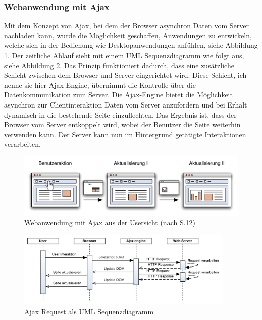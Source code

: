   \subsubsection{Webanwendung mit Ajax}
  
  Mit dem Konzept von \ac{Ajax}, bei dem der Browser asynchron Daten vom Server
  nachladen kann, wurde die Möglichkeit geschaffen, Anwendungen zu entwickeln,
  welche sich in der Bedienung wie Desktopanwendungen anfühlen, siehe Abbildung
  \ref{img:ajaxPageReload}. Der zeitliche Ablauf sieht mit einem \ac{UML}
  Sequenzdiagramm wie folgt aus, siehe Abbildung
  \ref{img:sequenzdiagrammAjaxPageReload}. Das Prinzip funktioniert dadurch,
  dass eine zusätzliche Schicht zwischen dem Browser und Server eingerichtet
  wird. Diese Schicht, ich nenne sie hier Ajax-Engine, übernimmt die Kontrolle
  über die Datenkommunikation zum Server. Die Ajax-Engine bietet die
  Möglichkeit asynchron zur Clientinteraktion Daten vom Server anzufordern und
  bei Erhalt dynamisch in die bestehende Seite einzuflechten. Das Ergebnis ist,
  dass der Browser vom Server entkoppelt wird, wobei der Benutzer die Seite
  weiterhin verwenden kann. Der Server kann nun im Hintergrund getätigte
  Interaktionen verarbeiten.
  
  \begin{figure}[hbt]
    \begin{center}
      \includegraphics[width=\textwidth]{./image/ajaxPageReload.pdf}
      \caption{Webanwendung mit Ajax aus der Usersicht (nach
      \cite{DiplomarbeitStephanSchuster} S.12)}
      \label{img:ajaxPageReload}
    \end{center}
  \end{figure}
  
  \begin{figure}[hbt]
    \begin{center}
      \includegraphics[width=0.93\textwidth]{./image/sequenzdiagrammAjaxPageReload.pdf}
      \caption{Ajax Request als \ac{UML} Sequenzdiagramm}
      \label{img:sequenzdiagrammAjaxPageReload}
    \end{center}
  \end{figure}
  
